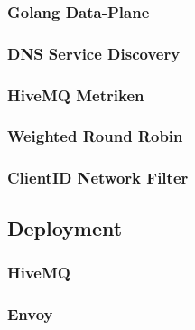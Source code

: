 \subsubsection{Golang Data-Plane}
\subsubsection{DNS Service Discovery}
\subsubsection{HiveMQ Metriken}
\subsubsection{Weighted Round Robin}
\subsubsection{ClientID Network Filter}

\subsection{Deployment}
\subsubsection{HiveMQ}
\subsubsection{Envoy}

